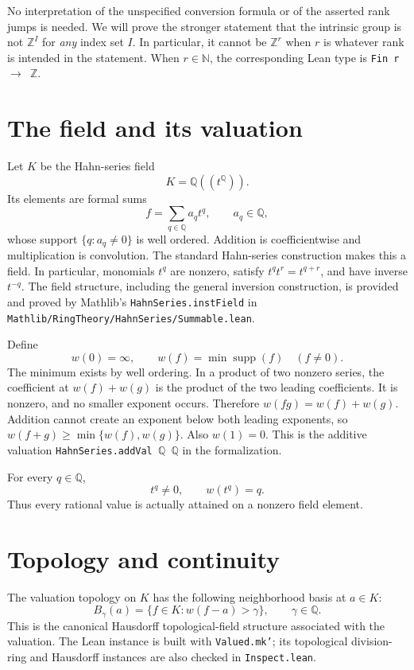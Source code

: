 \documentclass[11pt]{article}
\newcommand{\Q}{\mathbb{Q}}
\newcommand{\Z}{\mathbb{Z}}
\newcommand{\N}{\mathbb{N}}
\begin{document}
No interpretation of the unspecified conversion formula or of the asserted rank jumps is
needed. We will prove the stronger statement that the intrinsic group is not $\Z^I$ for
\emph{any} index set $I$. In particular, it cannot be $\Z^{r}$ when $r$ is whatever rank is
intended in the statement. When $r\in\N$, the corresponding Lean type is
\texttt{Fin r $\to$ $\Z$}.

\section{The field and its valuation}

Let $K$ be the Hahn-series field
\[
 K=\Q((t^{\Q})).
\]
Its elements are formal sums
\[
 f=\sum_{q\in\Q}a_qt^q,\qquad a_q\in\Q,
\]
whose support $\{q:a_q\ne0\}$ is well ordered. Addition is coefficientwise and multiplication
is convolution. The standard Hahn-series construction makes this a field. In particular,
monomials $t^q$ are nonzero, satisfy $t^qt^r=t^{q+r}$, and have inverse $t^{-q}$.
The field structure, including the general inversion construction, is provided and proved by
Mathlib's \texttt{HahnSeries.instField} in
\texttt{Mathlib/RingTheory/HahnSeries/Summable.lean}.

Define
\[
 w(0)=\infty,\qquad
 w(f)=\min\operatorname{supp}(f)\quad(f\ne0).
\]
The minimum exists by well ordering. In a product of two nonzero series, the coefficient at
$w(f)+w(g)$ is the product of the two leading coefficients. It is nonzero, and no smaller
exponent occurs. Therefore $w(fg)=w(f)+w(g)$. Addition cannot create an exponent below both
leading exponents, so $w(f+g)\geq\min\{w(f),w(g)\}$. Also $w(1)=0$.
This is the additive valuation \texttt{HahnSeries.addVal $\Q$ $\Q$} in the formalization.

For every $q\in\Q$,
\begin{equation}\label{eq:monomial}
 t^q\ne0,\qquad w(t^q)=q.
\end{equation}
Thus every rational value is actually attained on a nonzero field element.

\section{Topology and continuity}

The valuation topology on $K$ has the following neighborhood basis at $a\in K$:
\[
 B_\gamma(a)=\{f\in K:w(f-a)>\gamma\},\qquad \gamma\in\Q.
\]
This is the canonical Hausdorff topological-field structure associated with the valuation.
The Lean instance is built with \texttt{Valued.mk'}; its topological division-ring and
Hausdorff instances are also checked in \texttt{Inspect.lean}.
\end{document}
